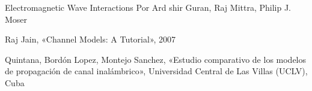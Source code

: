 \documentclass[conference, 9pt, a4paper]{IEEEtran}
\begin{document}
 
\begin{thebibliography}{99} %

\bibitem{} {Electromagnetic Wave Interactions
Por Ard shir Guran, Raj Mittra, Philip J. Moser}

\bibitem{} {Raj Jain, «Channel Models: A Tutorial», 2007}

\bibitem{} {Quintana, Bordón Lopez, Montejo Sanchez, «Estudio comparativo de los
modelos de propagación de canal inalámbrico», Universidad Central de
Las Villas (UCLV), Cuba}

\end{thebibliography}
\end{document}
